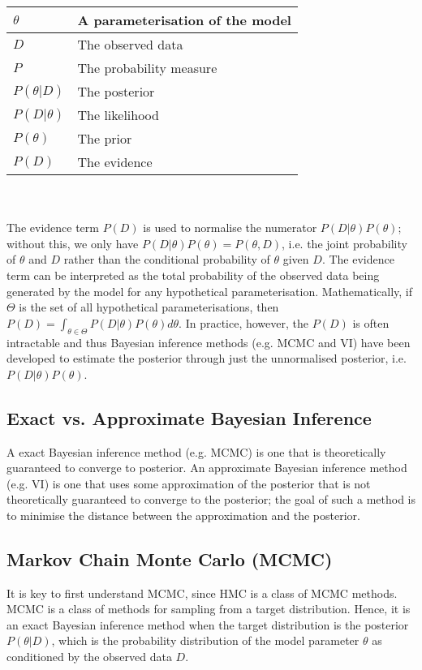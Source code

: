\documentclass[conference]{IEEEtran}
\begin{document}
\begin{tabular}{| m{1.5cm} | m{6cm} |}
    \hline
    $\theta$ & A parameterisation of the model \\
    \hline
    $D$ & The observed data \\
    \hline
    $P$ & The probability measure \\
    \hline
    $P(\theta|D)$ & The posterior \\
    \hline
    $P(D|\theta)$ & The likelihood \\
    \hline
    $P(\theta)$ & The prior \\
    \hline
    $P(D)$ & The evidence \\
    \hline
\end{tabular} \\~\\

The evidence term $P(D)$ is used to normalise the numerator $P(D|\theta)P(\theta)$; without this, we only have $P(D|\theta)P(\theta) = P(\theta, D)$, i.e. the joint probability of $\theta$ and $D$ rather than the conditional probability of $\theta$ given $D$. The evidence term can be interpreted as the total probability of the observed data being generated by the model for any hypothetical parameterisation. Mathematically, if $\Theta$ is the set of all hypothetical parameterisations, then $P(D) = \int_{\theta \in \Theta} P(D|\theta)P(\theta) d\theta$. In practice, however, the $P(D)$ is often intractable and thus Bayesian inference methods (e.g. MCMC and VI) have been developed to estimate the posterior through just the unnormalised posterior, i.e. $P(D|\theta)P(\theta)$.

\subsection{Exact vs. Approximate Bayesian Inference}
A exact Bayesian inference method (e.g. MCMC) is one that is theoretically guaranteed to converge to posterior. An approximate Bayesian inference method (e.g. VI) is one that uses some approximation of the posterior that is not theoretically guaranteed to converge to the posterior; the goal of such a method is to minimise the distance between the approximation and the posterior.

\subsection{Markov Chain Monte Carlo (MCMC)}
It is key to first understand MCMC, since HMC is a class of MCMC methods. MCMC is a class of methods for sampling from a target distribution. Hence, it is an exact Bayesian inference method when the target distribution is the posterior $P(\theta|D)$, which is the probability distribution of the model parameter $\theta$ as conditioned by the observed data $D$.\\
\end{document}
